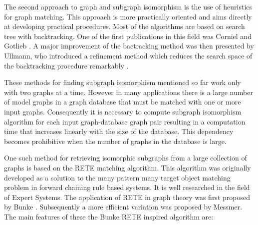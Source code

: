 The second approach to graph and subgraph isomorphism is the use of heuristics for graph matching. This approach is more practically oriented and aims 
directly at developing practical procedures. Most of the algorithms are based on search tree with backtracking. One of the first publications in this 
field was Corniel and Gotlieb \cite{corneil1970}. A major improvement of the bactracking method was then presented by Ullmann, who introduced  a refinement 
method which reduces the search space of the backtracking procedure remarkably \cite{ullmann1976}.

These methods for finding subgraph isomorphism mentioned so far work only with two graphs at a time. However in many applications there is a large number of model graphs in a graph database that must be matched with one or more input graphs. Consequently it is necessary to compute subgraph isomorphism algorithm for each input graph-database graph pair resulting in a computation time that increases linearly with the size of the database. This dependency becomes prohibitive when the number of graphs in the database is large.  


One such method for retrieving  isomorphic subgraphs from a large collection of graphs is based on the RETE \cite{forgy1982} matching algorithm. This algorithm was originally developed as a solution to the many pattern many target object matching problem in forward chaining rule based systems. It is well researched in the field of Expert Systems. The application of RETE in graph theory was first proposed by Bunke \cite{bunke_glauser_tran1991}. Subsequently a more efficient variation was proposed by Messmer\cite{messmer_bunke2000}. The main features of these the Bunke RETE inspired algorithm are: 

